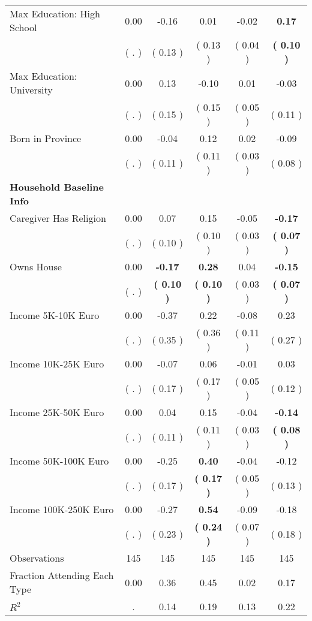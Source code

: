 \begin{table}[H]
{\begin{tabular}{lccccc}
\quad Max Education: High School &      0.00 &     -0.16 &      0.01 &     -0.02 & \textbf{     0.17} \\
\quad  & (        . ) & (     0.13 )  & (     0.13 )  & (     0.04 ) & \textbf{(     0.10 )} \\
\quad Max Education: University &      0.00 &      0.13 &     -0.10 &      0.01 &     -0.03 \\
\quad  & (        . ) & (     0.15 )  & (     0.15 )  & (     0.05 ) & (     0.11 ) \\
\quad Born in Province &      0.00 &     -0.04 &      0.12 &      0.02 &     -0.09 \\
\quad  & (        . ) & (     0.11 )  & (     0.11 )  & (     0.03 ) & (     0.08 ) \\
\midrule
\textbf{Household Baseline Info} \\
\quad Caregiver Has Religion &      0.00 &      0.07 &      0.15 &     -0.05 & \textbf{    -0.17} \\
\quad  & (        . ) & (     0.10 )  & (     0.10 )  & (     0.03 ) & \textbf{(     0.07 )} \\
\quad Owns House &      0.00 & \textbf{    -0.17} & \textbf{     0.28} &      0.04 & \textbf{    -0.15} \\
\quad  & (        . ) & \textbf{(     0.10 )}  & \textbf{(     0.10 )}  & (     0.03 ) & \textbf{(     0.07 )} \\
\quad Income 5K-10K Euro &      0.00 &     -0.37 &      0.22 &     -0.08 &      0.23 \\
\quad  & (        . ) & (     0.35 )  & (     0.36 )  & (     0.11 ) & (     0.27 ) \\
\quad Income 10K-25K Euro &      0.00 &     -0.07 &      0.06 &     -0.01 &      0.03 \\
\quad  & (        . ) & (     0.17 )  & (     0.17 )  & (     0.05 ) & (     0.12 ) \\
\quad Income 25K-50K Euro &      0.00 &      0.04 &      0.15 &     -0.04 & \textbf{    -0.14} \\
\quad  & (        . ) & (     0.11 )  & (     0.11 )  & (     0.03 ) & \textbf{(     0.08 )} \\
\quad Income 50K-100K Euro &      0.00 &     -0.25 & \textbf{     0.40} &     -0.04 &     -0.12 \\
\quad  & (        . ) & (     0.17 )  & \textbf{(     0.17 )}  & (     0.05 ) & (     0.13 ) \\
\quad Income 100K-250K Euro &      0.00 &     -0.27 & \textbf{     0.54} &     -0.09 &     -0.18 \\
\quad  & (        . ) & (     0.23 )  & \textbf{(     0.24 )}  & (     0.07 ) & (     0.18 ) \\
\midrule
Observations & 145 & 145 & 145 & 145 & 145 \\
Fraction Attending Each Type &      0.00 &      0.36 &      0.45 &      0.02 &      0.17 \\
\midrule
$ R^2$ &         . &      0.14 &      0.19 &      0.13 &      0.22 \\
\bottomrule
\end{tabular}}
\end{table}
